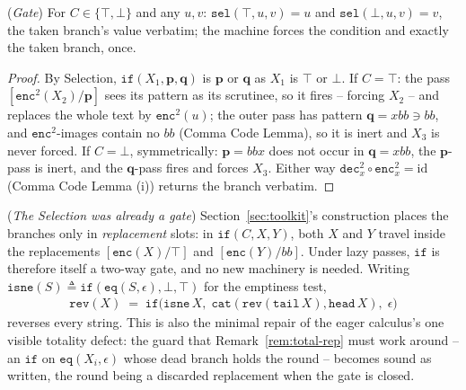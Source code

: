 \documentclass[runningheads,envcountsect]{llncs}
\renewenvironment{remark}
  {\rmfamily\trivlist\item[\hskip\labelsep{\itshape Remark.}]\ignorespaces}
  {\endtrivlist}
\begin{document}
\begin{theorem}
    (\emph{Gate})
    \label{thm:gate}
    For $C \in \{\top, \bot\}$ and any $u, v$: $\mathtt{sel}(\top, u, v) = u$ and $\mathtt{sel}(\bot, u, v) = v$, the taken branch's value verbatim; the machine forces the condition and exactly the taken branch, once.
\end{theorem}

\begin{proof}
    By Selection, $\mathtt{if}(X_1, \mathbf{p}, \mathbf{q})$ is $\mathbf{p}$ or $\mathbf{q}$ as $X_1$ is $\top$ or $\bot$. If $C = \top$: the pass $[\mathtt{enc}^2(X_2)/\mathbf{p}]$ sees its pattern as its scrutinee, so it fires -- forcing $X_2$ -- and replaces the whole text by $\mathtt{enc}^2(u)$; the outer pass has pattern $\mathbf{q} = xbb \ni bb$, and $\mathtt{enc}^2$-images contain no $bb$ (Comma Code Lemma), so it is inert and $X_3$ is never forced. If $C = \bot$, symmetrically: $\mathbf{p} = bbx$ does not occur in $\mathbf{q} = xbb$, the $\mathbf{p}$-pass is inert, and the $\mathbf{q}$-pass fires and forces $X_3$. Either way $\mathtt{dec}^2_x \circ \mathtt{enc}^2_x = \mathrm{id}$ (Comma Code Lemma (i)) returns the branch verbatim.
\end{proof}

\begin{remark}
    (\emph{The Selection was already a gate})
    \label{rem:ifgate}
    Section~\ref{sec:toolkit}'s construction places the branches only in \emph{replacement} slots: in $\mathtt{if}(C,X,Y)$, both $X$ and $Y$ travel inside the replacements $[\mathtt{enc}(X)/\top]$ and $[\mathtt{enc}(Y)/bb]$. Under lazy passes, $\mathtt{if}$ is therefore itself a two-way gate, and no new machinery is needed. Writing $\mathtt{isne}(S) \triangleq \mathtt{if}(\mathtt{eq}(S,\epsilon), \bot, \top)$ for the emptiness test,
    \begin{align}
        \mathtt{rev}(X) \;=\; \mathtt{if}\big(\mathtt{isne}\,X,\;\mathtt{cat}(\mathtt{rev}(\mathtt{tail}\,X), \mathtt{head}\,X),\;\epsilon\big)
    \end{align}
    reverses every string. This is also the minimal repair of the eager calculus's one visible totality defect: the guard that Remark~\ref{rem:total-rep} must work around -- an $\mathtt{if}$ on $\mathtt{eq}(X_i, \epsilon)$ whose dead branch holds the round -- becomes sound as written, the round being a discarded replacement when the gate is closed.
\end{remark}
\end{document}
